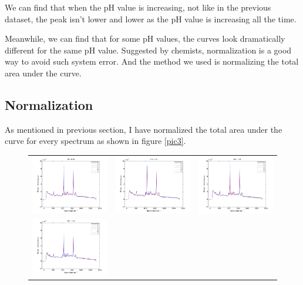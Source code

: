 \documentclass[a4paper]{article}
\begin{document}
We can find that when the pH value is increasing, not like in the previous dataset, the peak isn't lower and lower as the pH value is increasing all the time.

Meanwhile, we can find that for some pH values, the curves look dramatically different for the same pH value.  Suggested by chemists, normalization is a good way to avoid such system error. And the method we used is normalizing the total area under the curve.
\subsection{Normalization}
As mentioned in previous section, I have normalized the total area under the curve for every spectrum as shown in figure \ref{pic3}.
\begin{figure}[h]
\centering
\begin{tabular}{ccc}
\includegraphics[width=.33\textwidth]{images/n1.pdf}  & 
\includegraphics[width=.33\textwidth]{images/n2.pdf}  &
\includegraphics[width=.33\textwidth]{images/n3.pdf}  \\ 
\includegraphics[width=.33\textwidth]{images/n4.pdf}  &

\end{tabular}
\end{figure}
\end{document}

